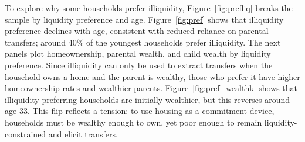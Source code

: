 \documentclass[12pt]{article}
\begin{document}
To explore why some households prefer illiquidity, Figure~\ref{fig:prefliq} breaks the sample by liquidity preference and age. Figure~\ref{fig:pref} shows that illiquidity preference declines with age, consistent with reduced reliance on parental transfers; around 40\% of the youngest households prefer illiquidity. The next panels plot homeownership, parental wealth, and child wealth by liquidity preference. Since illiquidity can only be used to extract transfers when the household owns a home and the parent is wealthy, those who prefer it have higher homeownership rates and wealthier parents. Figure~\ref{fig:pref_wealthk} shows that illiquidity-preferring households are initially wealthier, but this reverses around age 33. This flip reflects a tension: to use housing as a commitment device, households must be wealthy enough to own, yet poor enough to remain liquidity-constrained and elicit transfers.
\end{document}
